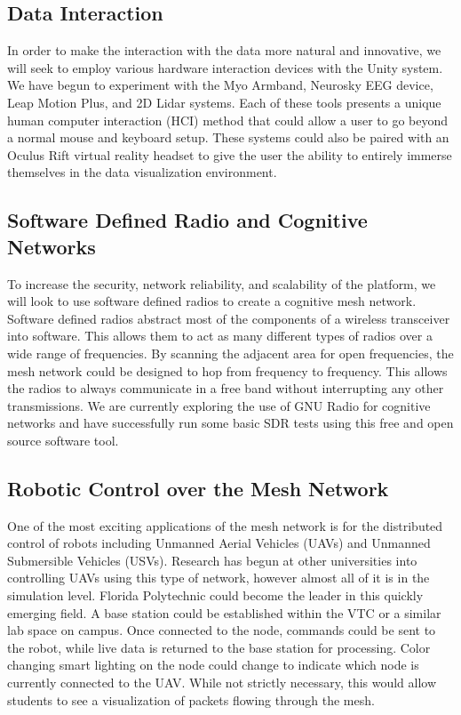\documentclass{IEEEtran}
\begin{document}
\subsection{Data Interaction}

In order to make the interaction with the data more natural and innovative, we will seek to employ various hardware interaction devices with the Unity system. We have begun to experiment with the Myo Armband, Neurosky EEG device, Leap Motion Plus, and 2D Lidar systems. Each of these tools presents a unique human computer interaction (HCI) method that could allow a user to go beyond a normal mouse and keyboard setup. These systems could also be paired with an Oculus Rift virtual reality headset to give the user the ability to entirely immerse themselves in the data visualization environment.  

\subsection{Software Defined Radio and Cognitive Networks}

	To increase the security, network reliability, and scalability of the platform, we will look to use software defined radios to create a cognitive mesh network. Software defined radios abstract most of the components of a wireless transceiver into software. This allows them to act as many different types of radios over a wide range of frequencies. By scanning the adjacent area for open frequencies, the mesh network could be designed to hop from frequency to frequency. This allows the radios to always communicate in a free band without interrupting any other transmissions. We are currently exploring the use of GNU Radio for cognitive networks and have successfully run some basic SDR tests using this free and open source software tool. 

\subsection{Robotic Control over the Mesh Network}

	One of the most exciting applications of the mesh network is for the distributed control of robots including Unmanned Aerial Vehicles (UAVs) and Unmanned Submersible Vehicles (USVs). Research has begun at other universities into controlling UAVs using this type of network, however almost all of it is in the simulation level. Florida Polytechnic could become the leader in this quickly emerging field. A base station could be established within the VTC or a similar lab space on campus. Once connected to the node, commands could be sent to the robot, while live data is returned to the base station for processing. Color changing smart lighting on the node could change to indicate which node is currently connected to the UAV. While not strictly necessary, this would allow students to see a visualization of packets flowing through the mesh. 
\end{document}
